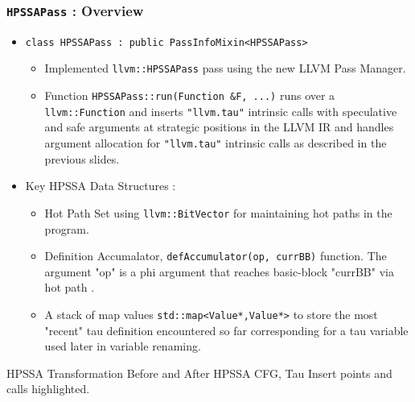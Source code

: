 \documentclass[aspectratio=169]{beamer}
\begin{document}
\begin{frame}
	\frametitle{\texttt{HPSSAPass} : Overview}
	\begin{itemize}
		\item \texttt{class HPSSAPass : public PassInfoMixin<HPSSAPass>}
		\begin{itemize}
			\footnotesize
			\item Implemented \texttt{llvm::HPSSAPass} pass using the new LLVM Pass Manager. 
			\item Function \texttt{HPSSAPass::run(Function &F, ...)}  runs over a \texttt{llvm::Function} and inserts \texttt{"llvm.tau"} intrinsic calls with speculative and safe arguments at strategic positions in the LLVM IR and handles argument allocation for  \texttt{"llvm.tau"} intrinsic calls as described in the previous slides.
		\end{itemize}
		\item Key HPSSA Data Structures :  
		\begin{itemize}
			\footnotesize
			\item Hot Path Set using \texttt{llvm::BitVector} for maintaining \color{red} hot paths \color{black} in the program.
			\item Definition Accumalator, \texttt{defAccumulator(op, currBB)} function. %
			The argument "op" is a phi argument that reaches basic-block "currBB" via \color{red} hot path \color{black}. 
			\item A stack of map values \texttt{std::map<Value*,Value*>} to store the most "recent" tau definition encountered so far corresponding for a tau variable used later in variable renaming. 
		\end{itemize}
	\end{itemize}
\end{frame}

\begin{frame}{HPSSA Transformation}
	\centering
	Before and After HPSSA CFG, Tau Insert points and calls highlighted.
\end{frame}
\end{document}
